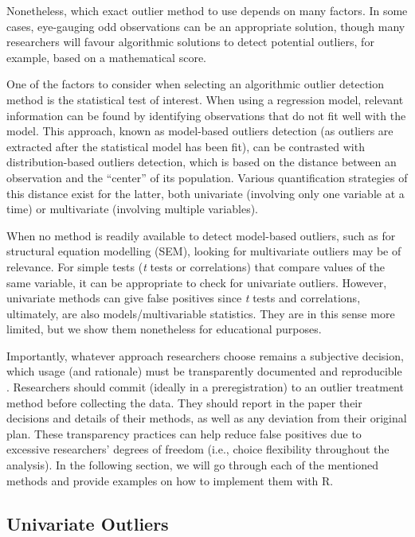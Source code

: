 \documentclass[mathematics,article,submit,moreauthors,pdftex]{mdpi}
\begin{document}
Nonetheless, which exact outlier method to use depends on many factors.
In some cases, eye-gauging odd observations can be an appropriate
solution, though many researchers will favour algorithmic solutions to
detect potential outliers, for example, based on a mathematical score.

One of the factors to consider when selecting an algorithmic outlier
detection method is the statistical test of interest. When using a
regression model, relevant information can be found by identifying
observations that do not fit well with the model. This approach, known
as model-based outliers detection (as outliers are extracted after the
statistical model has been fit), can be contrasted with
distribution-based outliers detection, which is based on the distance
between an observation and the ``center'' of its population. Various
quantification strategies of this distance exist for the latter, both
univariate (involving only one variable at a time) or multivariate
(involving multiple variables).

When no method is readily available to detect model-based outliers, such
as for structural equation modelling (SEM), looking for multivariate
outliers may be of relevance. For simple tests (\emph{t} tests or
correlations) that compare values of the same variable, it can be
appropriate to check for univariate outliers. However, univariate
methods can give false positives since \emph{t} tests and correlations,
ultimately, are also models/multivariable statistics. They are in this
sense more limited, but we show them nonetheless for educational
purposes.

Importantly, whatever approach researchers choose remains a subjective
decision, which usage (and rationale) must be transparently documented
and reproducible \citep{leys2019outliers}. Researchers should commit
(ideally in a preregistration) to an outlier treatment method before
collecting the data. They should report in the paper their decisions and
details of their methods, as well as any deviation from their original
plan. These transparency practices can help reduce false positives due
to excessive researchers' degrees of freedom (i.e., choice flexibility
throughout the analysis). In the following section, we will go through
each of the mentioned methods and provide examples on how to implement
them with R.

\hypertarget{univariate-outliers}{%
\subsection{Univariate Outliers}\label{univariate-outliers}}
\end{document}
